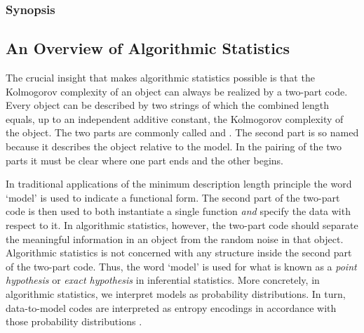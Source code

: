 \subsubsection{Synopsis}

\subsection{An Overview of Algorithmic Statistics}
The crucial insight that makes algorithmic statistics possible is that the Kolmogorov complexity of an object can always be realized by a two-part code.
Every object can be described by two strings of which the combined length equals, up to an independent additive constant, the Kolmogorov complexity of the object.
The two parts are commonly called  and .
The second part is so named because it describes the object relative to the model.
In the pairing of the two parts it must be clear where one part ends and the other begins.

In traditional applications of the minimum description length principle \parencite{rissanen1978modeling,rissanen1983universal,vitanyi2000minimum,grunwald2007minimum} the word `model' is used to indicate a functional form.
The second part of the two-part code is then used to both instantiate a single function \emph{and} specify the data with respect to it.
In algorithmic statistics, however, the two-part code should separate the meaningful information in an object from the random noise in that object.
Algorithmic statistics is not concerned with any structure inside the second part of the two-part code.
Thus, the word `model' is used for what is known as a \emph{point hypothesis} or \emph{exact hypothesis} in inferential statistics.
More concretely, in algorithmic statistics, we interpret models as probability distributions.
In turn, data-to-model codes are interpreted as entropy encodings in accordance with those probability distributions \parencite{vereshchagin2004kolmogorov,cover2006elements}.


